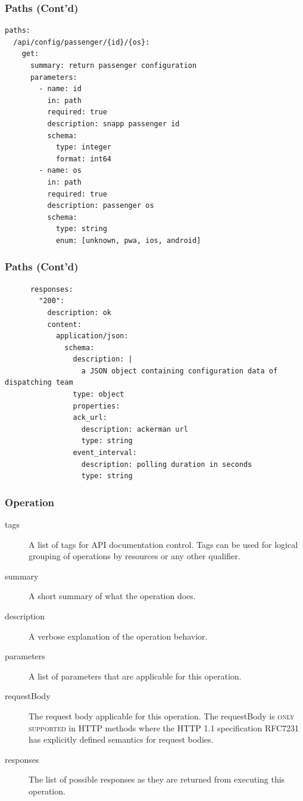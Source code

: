 \documentclass{efd-lecture}
\begin{document}
\begin{frame}[fragile]
  \frametitle{Paths (Cont'd)}
  \scriptsize
  \begin{verbatim}
paths:
  /api/config/passenger/{id}/{os}:
    get:
      summary: return passenger configuration
      parameters:
        - name: id
          in: path
          required: true
          description: snapp passenger id
          schema:
            type: integer
            format: int64
        - name: os
          in: path
          required: true
          description: passenger os
          schema:
            type: string
            enum: [unknown, pwa, ios, android]
  \end{verbatim}
\end{frame}

\begin{frame}[fragile]
  \frametitle{Paths (Cont'd)}
  \scriptsize
  \begin{verbatim}
      responses:
        "200":
          description: ok
          content:
            application/json:
              schema:
                description: |
                  a JSON object containing configuration data of dispatching team
                type: object
                properties:
                ack_url:
                  description: ackerman url
                  type: string
                event_interval:
                  description: polling duration in seconds
                  type: string
  \end{verbatim}
\end{frame}

\begin{frame}
  \frametitle{Operation}
  \begin{description}
    \item[tags] A list of tags for API documentation control. Tags can be used for logical grouping of operations by resources or any other qualifier.
    \item[summary] A short summary of what the operation does.
    \item[description] A verbose explanation of the operation behavior.
    \item[parameters] A list of parameters that are applicable for this operation.
    \item[requestBody] The request body applicable for this operation. The requestBody is \textsc{\color{RubineRed}only supported} in HTTP methods where the HTTP 1.1 specification RFC7231 has explicitly defined semantics for request bodies.
    \item[responses] The list of possible responses as they are returned from executing this operation.
  \end{description}
\end{frame}
\end{document}
